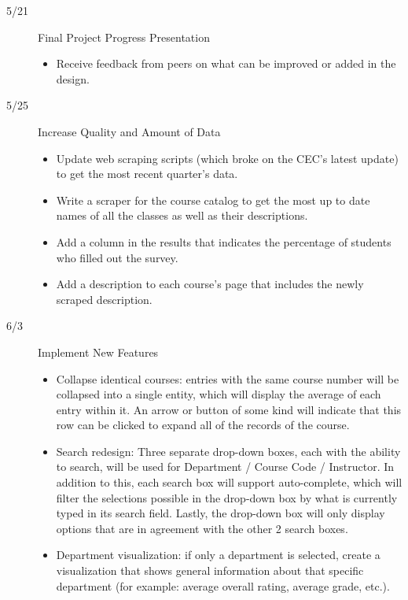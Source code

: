 \documentclass{article}
\begin{document}
\begin{description}
    \item[5/21] Final Project Progress Presentation
    \begin{itemize}
        \item Receive feedback from peers on what can be improved or added in the design.
    \end{itemize}

    \item[5/25] Increase Quality and Amount of Data
    \begin{itemize}
        \item Update web scraping scripts (which broke on the CEC's latest update) to get the most recent quarter's data.
        \item Write a scraper for the course catalog to get the most up to date names of all the classes as well as their descriptions.
        \item Add a column in the results that indicates the percentage of students who filled out the survey.
        \item Add a description to each course's page that includes the newly scraped description.
    \end{itemize}

    \item[6/3] Implement New Features
    \begin{itemize}
        \item Collapse identical courses: entries with the same course number will be collapsed into a single entity, which will display the average of each entry within it. An arrow or button of some kind will indicate that this row can be clicked to expand all of the records of the course.
        \item Search redesign: Three separate drop-down boxes, each with the ability to search, will be used for Department / Course Code / Instructor. In addition to this, each search box will support auto-complete, which will filter the selections possible in the drop-down box by what is currently typed in its search field. Lastly, the drop-down box will only display options that are in agreement with the other 2 search boxes.
        \item Department visualization: if only a department is selected, create a visualization that shows general information about that specific department (for example: average overall rating, average grade, etc.).
    \end{itemize}


\end{description}
\end{document}
